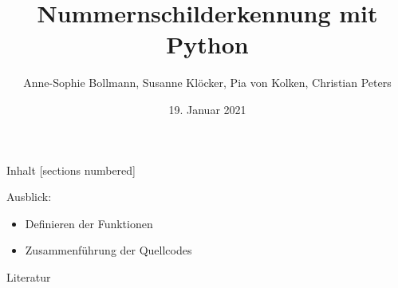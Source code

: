 \documentclass[10pt]{beamer}
\title{Nummernschilderkennung mit Python}
\date{19. Januar 2021}
\author{Anne-Sophie Bollmann, Susanne Kl\"ocker, Pia von Kolken, Christian Peters}
\begin{document}
\maketitle

\begin{frame}{Inhalt}
  [sections numbered]
  \tableofcontents
\end{frame}








\begin{frame}[standout]
  Ausblick:
  \begin{itemize}
  \item Definieren der Funktionen 
  \item Zusammenführung der Quellcodes
  \end{itemize}
\end{frame}

\appendix

\begin{frame}[allowframebreaks]{Literatur}

  
  

\end{frame}
\end{document}
